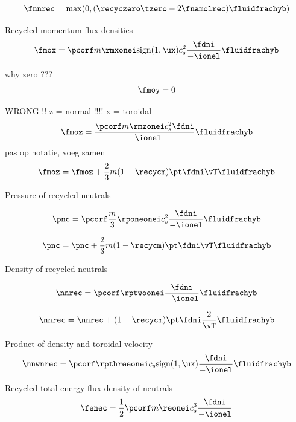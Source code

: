 \begin{equation}
          \fnnrec = \mathrm{max}(0,(\recyczero \tzero - 2 \fnamolrec) \fluidfrachyb)
\end{equation}

Recycled momentum flux densities
\begin{equation}
    \fmox = \pcorf m \rmxonei \mathrm{sign}(1,\ux) c_s^2 \frac{\fdni}{- \ionel} \fluidfrachyb
\end{equation}


why zero ???
\begin{equation}
    \fmoy = 0
\end{equation}

WRONG !! z = normal !!!!
x = toroidal
\begin{equation}
    \fmoz = \frac{\pcorf m \rmzonei c_s^2 \fdni}{- \ionel} \fluidfrachyb
\end{equation}
pas op notatie, voeg samen
\begin{equation}
    \fmoz = \fmoz + \frac{2}{3} m (1-\recycm) \pt \fdni \vT \fluidfrachyb
\end{equation}

Pressure of recycled neutrals

\begin{equation}
    \pnc = \pcorf \frac{m}{3} \rponeonei c_s^2 \frac{\fdni}{-\ionel} \fluidfrachyb
\end{equation}

\begin{equation}
    \pnc = \pnc + \frac{2}{3} m (1-\recycm) \pt \fdni \vT \fluidfrachyb
\end{equation}

Density of recycled neutrals

\begin{equation}
    \nnrec = \pcorf \rptwoonei \frac{\fdni}{-\ionel} \fluidfrachyb
\end{equation}

\begin{equation}
    \nnrec = \nnrec + (1-\recycm) \pt \fdni \frac{2}{\vT} \fluidfrachyb
\end{equation}

Product of density and toroidal velocity
\begin{equation}
    \nnwnrec = \pcorf \rpthreeonei c_s \mathrm{sign}(1,\ux) \frac{\fdni}{-\ionel} \fluidfrachyb
\end{equation}

Recycled total energy flux density of neutrals
\begin{equation}
    \fenec = \frac{1}{2} \pcorf m \reonei c_s^3 \frac{\fdni}{-\ionel}
\end{equation}


